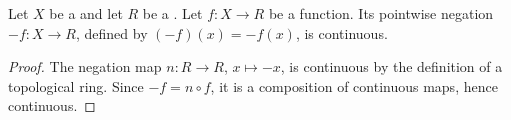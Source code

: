 \begin{proposition} \label{proposition:pointwise_negation_of_continuous_functions_on_topological_spaces_valued_in_topological_rings_are_continuous}
    Let $X$ be a  and let $R$ be a . Let $f : X \to R$ be a  function. Its pointwise negation $-f : X \to R$, defined by $(-f)(x) = -f(x)$, is continuous.
\end{proposition}
\begin{proof}
    The negation map $n : R \to R$, $x \mapsto -x$, is continuous by the definition of a topological ring. Since $-f = n \circ f$, it is a composition of continuous maps, hence continuous.
\end{proof}